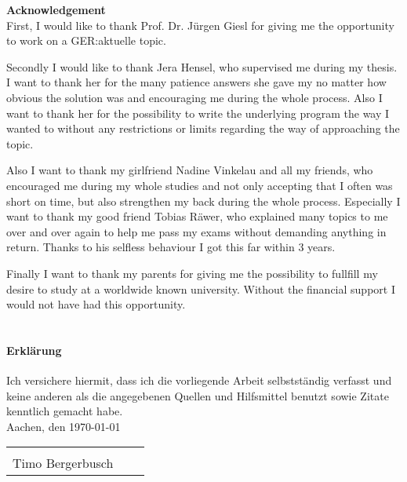 {\bf\Large Acknowledgement} \\ [1em] 

First, I would like to thank Prof. Dr. Jürgen Giesl for giving me the opportunity to work on a GER:aktuelle topic.

Secondly I would like to thank Jera Hensel, who supervised me during my thesis. I want to thank her for the many patience answers she gave my no matter how obvious the solution was and encouraging me during the whole process. Also I want to thank her for the possibility to write the underlying program the way I wanted to without any restrictions or limits regarding the way of approaching the topic. 

Also I want to thank my girlfriend Nadine Vinkelau and all my friends, who encouraged me during my whole studies and not only accepting that I often was short on time, but also strengthen my back during the whole process. Especially I want to thank my good friend Tobias Räwer, who explained many topics to me over and over again to help me pass my exams without demanding anything in return. Thanks to his selfless behaviour I got this far within 3 years.

Finally I want to thank my parents for giving me the possibility to fullfill my desire to study at a worldwide known university. Without the financial support I would not have had this opportunity. \\ \\

\paragraph{Erklärung} Ich versichere hiermit, dass ich die vorliegende Arbeit selbstständig verfasst und keine
anderen als die angegebenen Quellen und Hilfsmittel benutzt sowie Zitate kenntlich
gemacht habe.\newline \\
Aachen, den \today

\begin{tabular}{lp{2em}l} 
	\hspace{4cm} \\\cline{1-1}\cline{3-3} 
	Timo Bergerbusch
\end{tabular}
